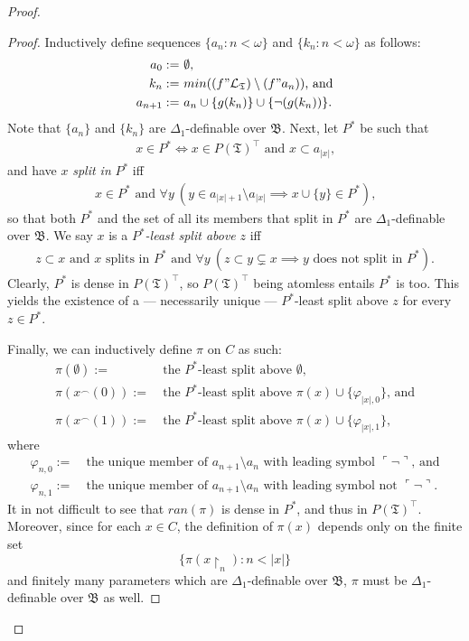 \documentclass[12pt, twoside]{memoir}
\numberwithin{equation}{section}
\theoremstyle{definition}
\theoremstyle{remark}
\theoremstyle{definition}
\theoremstyle{definition}
\theoremstyle{definition}
\theoremstyle{remark}
\begin{document}
\begin{proof}
\begin{proof}
Inductively define sequences $\{a_n : n < \omega\}$ and $\{k_n : n < \omega\}$ as follows:
\begin{align*}
    a_0 := \ & \emptyset \text{,} \\
    k_n := \ & min((f" \mathcal{L}_{\mathfrak{T}}) \setminus (f" a_n)) \text{, and} \\
    a_{n + 1} := \ & a_n \cup \{g(k_n)\} \cup \{\neg(g(k_n))\} \text{.}
\end{align*}
Note that $\{a_n\}$ and $\{k_n\}$ are $\Delta_1$-definable over $\mathfrak{B}$. Next, let $P^*$ be such that
\begin{align*}
    x \in P^* \iff x \in P(\mathfrak{T})^{\top} \text{ and } x \subset a_{|x|} \text{,}
\end{align*}
and have $x$ \emph{split in} $P^*$ iff
\begin{align*}
    x \in P^* \text{ and } \forall y \ (y \in a_{|x| + 1} \setminus a_{|x|} \implies x \cup \{y\} \in P^*) \text{,}
\end{align*}
so that both $P^*$ and the set of all its members that split in $P^*$ are $\Delta_1$-definable over $\mathfrak{B}$. We say $x$ is a $P^*$\emph{-least split above} $z$ iff
\begin{align*}
    z \subset x \text{ and } x \text{ splits in } P^* \text{ and } \forall y \ (z \subset y \subsetneq x \implies y \text{ does not split in } P^*) \text{.}
\end{align*}
Clearly, $P^*$ is dense in $P(\mathfrak{T})^{\top}$, so $P(\mathfrak{T})^{\top}$ being atomless entails $P^*$ is too. This yields the existence of a --- necessarily unique --- $P^*$-least split above $z$ for every $z \in P^*$.

Finally, we can inductively define $\pi$ on $C$ as such:
\begin{align*}
    \pi(\emptyset) := \ & \text{the } P^* \text{-least split above } \emptyset \text{,} \\
    \pi(x^{\frown}(0)) := \ & \text{the } P^* \text{-least split above } \pi(x) \cup \{\varphi_{|x|, 0}\} \text{, and} \\
    \pi(x^{\frown}(1)) := \ & \text{the } P^* \text{-least split above } \pi(x) \cup \{\varphi_{|x|, 1}\} \text{,}
\end{align*}
where
\begin{align*}
    \varphi_{n, 0} := \ & \text{the unique member of } a_{n + 1} \setminus a_n \text{ with leading symbol } \ulcorner \neg \urcorner \text{, and} \\
    \varphi_{n, 1} := \ & \text{the unique member of } a_{n + 1} \setminus a_n \text{ with leading symbol not } \ulcorner \neg \urcorner \text{.} 
\end{align*}
It in not difficult to see that $ran(\pi)$ is dense in $P^*$, and thus in $P(\mathfrak{T})^{\top}$. Moreover, since for each $x \in C$, the definition of $\pi(x)$ depends only on the finite set $$\{\pi(x \! \restriction_n) : n < |x|\}$$ and finitely many parameters which are $\Delta_1$-definable over $\mathfrak{B}$, $\pi$ must be $\Delta_1$-definable over $\mathfrak{B}$ as well.
\end{proof}


\end{proof}
\end{document}
